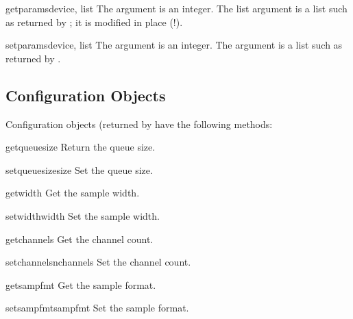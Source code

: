 \begin{funcdesc}{getparams}{device, list}
The  argument is an integer.  The list argument is a list
such as returned by ; it is modified in place
(!).
\end{funcdesc}

\begin{funcdesc}{setparams}{device, list}
The  argument is an integer.  The  argument is a
list such as returned by .
\end{funcdesc}


\subsection{Configuration Objects \label{al-config-objects}}

Configuration objects (returned by  have the
following methods:

\begin{methoddesc}{getqueuesize}{}
Return the queue size.
\end{methoddesc}

\begin{methoddesc}{setqueuesize}{size}
Set the queue size.
\end{methoddesc}

\begin{methoddesc}{getwidth}{}
Get the sample width.
\end{methoddesc}

\begin{methoddesc}{setwidth}{width}
Set the sample width.
\end{methoddesc}

\begin{methoddesc}{getchannels}{}
Get the channel count.
\end{methoddesc}

\begin{methoddesc}{setchannels}{nchannels}
Set the channel count.
\end{methoddesc}

\begin{methoddesc}{getsampfmt}{}
Get the sample format.
\end{methoddesc}

\begin{methoddesc}{setsampfmt}{sampfmt}
Set the sample format.
\end{methoddesc}

